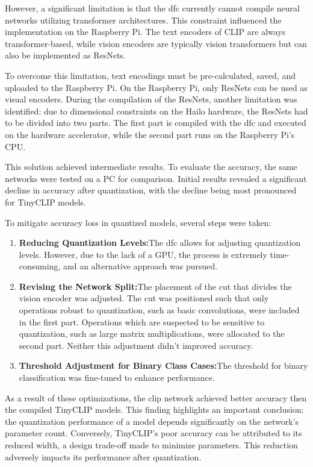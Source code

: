 However, a significant limitation is that the \acrshort{dfc} currently cannot compile neural networks utilizing transformer architectures.  
This constraint influenced the implementation on the Raspberry Pi.  
The text encoders of CLIP are always transformer-based, while vision encoders are typically vision transformers but can also be implemented as ResNets.  

To overcome this limitation, text encodings must be pre-calculated, saved, and uploaded to the Raspberry Pi.  
On the Raspberry Pi, only ResNets can be used as visual encoders.  
During the compilation of the ResNets, another limitation was identified: due to dimensional constraints on the Hailo hardware, the ResNets had to be divided into two parts.  
The first part is compiled with the \acrshort{dfc} and executed on the hardware accelerator, while the second part runs on the Raspberry Pi's CPU.  

This solution achieved intermediate results.  
To evaluate the accuracy, the same networks were tested on a PC for comparison.  
Initial results revealed a significant decline in accuracy after quantization, with the decline being most pronounced for TinyCLIP models.\hfill\break

To mitigate accuracy loss in quantized models, several steps were taken:  
\begin{enumerate}
    \item  \textbf{Reducing Quantization Levels:}The \acrshort{dfc} allows for adjusting quantization levels.  
    However, due to the lack of a GPU, the process is extremely time-consuming, and an alternative approach was pursued.
    \item \textbf{Revising the Network Split:}The placement of the cut that divides the vision encoder was adjusted.  
    The cut was positioned such that only operations robust to quantization, such as basic convolutions, were included in the first part.  
    Operations which are suspected to be sensitive to quantization, such as large matrix multiplications, were allocated to the second part.  
    Neither this adjustment didn't improved accuracy.
    \item \textbf{Threshold Adjustment for Binary Class Cases:}The threshold for binary classification was fine-tuned to enhance performance. 
\end{enumerate}

As a result of these optimizations, the \acrshort{clip} network achieved better accuracy then the compiled TinyCLIP models.  
This finding highlights an important conclusion: the quantization performance of a model depends significantly on the network's parameter count.
Conversely, TinyCLIP's poor accuracy can be attributed to its reduced width, a design trade-off made to minimize parameters.  
This reduction adversely impacts its performance after quantization.


